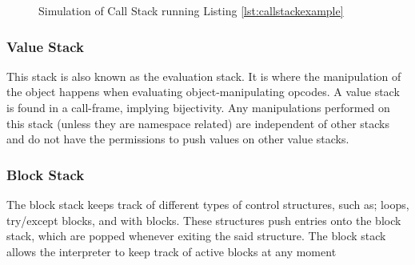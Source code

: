 {\begin{figure}
\begin{tikzpicture}
				\end{tikzpicture}

				\caption{Simulation of Call Stack running Listing \ref{lst:callstackexample}}
				\label{fig:call_stack_example}

			\end{figure}

			\subsubsection*{Value Stack}
			\label{subsubsec:value_stack}
			\par This stack is also known as the evaluation stack. It is where the manipulation of the object happens when evaluating object-manipulating opcodes.
			A value stack is found in a call-frame, implying bijectivity. Any manipulations performed on this stack (unless they are namespace related) are independent of other stacks and
			do not have the permissions to push values on other value stacks.
			
			\subsubsection*{Block Stack}
			\label{subsubsec:block_stack}

			\par The block stack keeps track of different types of control structures, such as; loops, try/except blocks, and with blocks. These structures push entries onto the block stack, which are popped whenever exiting
			the said structure. The block stack allows the interpreter to keep track of active blocks at any moment

			\begin{figure}
				\centering

\end{figure}}
